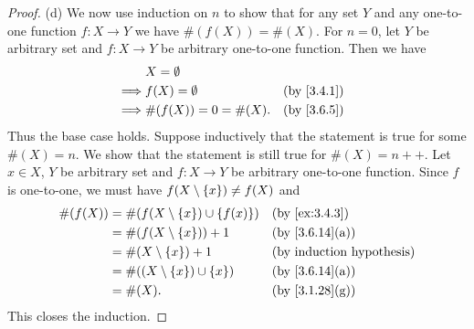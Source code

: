 \begin{proof}{(d)}
	We now use induction on \(n\) to show that for any set \(Y\) and any one-to-one function \(f : X \to Y\) we have \(\#(f(X)) = \#(X)\).
	For \(n = 0\), let \(Y\) be arbitrary set and \(f : X \to Y\) be arbitrary one-to-one function.
	Then we have
	\begin{align*}
		         & X = \emptyset                         \\
		\implies & f(X) = \emptyset      &  & \by{3.4.1} \\
		\implies & \#(f(X)) = 0 = \#(X). &  & \by{3.6.5}
	\end{align*}
	Thus the base case holds.
	Suppose inductively that the statement is true for some \(\#(X) = n\).
	We show that the statement is still true for \(\#(X) = n++\).
	Let \(x \in X\), \(Y\) be arbitrary set and \(f : X \to Y\) be arbitrary one-to-one function.
	Since \(f\) is one-to-one, we must have \(f(X \setminus \left\lbrace x\right\rbrace) \neq f(X)\) and
	\begin{align*}
		\#(f(X)) & = \#(f(X \setminus \set{x}) \cup \set{f(x)}) &  & \by{ex:3.4.3}                \\
		         & = \#(f(X \setminus \set{x})) + 1             &  & \text{(by \cref{3.6.14}(a))} \\
		         & = \#(X \setminus \set{x}) + 1                &  & \byIH                        \\
		         & = \#((X \setminus \set{x}) \cup \set{x})     &  & \text{(by \cref{3.6.14}(a))} \\
		         & = \#(X).                                     &  & \text{(by \cref{3.1.28}(g))}
	\end{align*}
	This closes the induction.
\end{proof}

